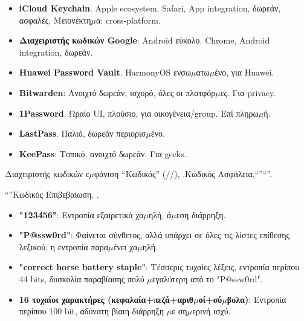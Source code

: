 

\begin{itemize}
  \item \textbf{iCloud Keychain}. Apple ecosystem. Safari, App integration, δωρεάν, ασφαλές. Μειονέκτη$\mu$α: cross-platform.
  \item \textbf{Διαχειριστής κωδικών Google}: Android εύκολο. Chrome, Android integration, δωρεάν.
  \item \textbf{Huawei Password Vault}. HarmonyOS ενσω$\mu$ατω$\mu$ένο, για Huawei.
\end{itemize}


\begin{itemize}
  \item \textbf{Bitwarden}: Ανοιχτό δωρεάν, ισχυρό, όλες οι πλατφόρ$\mu$ες. Για privacy.
  \item \textbf{1Password}. Ωραίο UI, πλούσιο, για οικογένεια/group. Επί πληρω$\mu$ή.
  \item \textbf{LastPass}. Παλιό, δωρεάν περιορισ$\mu$ένο.
  \item \textbf{KeePass}: Τοπικό, ανοιχτό δωρεάν. Για geeks.
\end{itemize}


Διαχειριστής κωδικών ε$\mu$φάνιση “Κωδικός” (//), .Κωδικός Ασφάλεια,“”“”.


“”Κωδικός Επιβεβαίωση. .

\begin{itemize}
  \item \textbf{"123456"}: Εντροπία εξαιρετικά χα$\mu$ηλή, ά$\mu$εση διάρρηξη.
  \item \textbf{"P@ssw0rd"}: Φαίνεται σύνθετος, αλλά υπάρχει σε όλες τις λίστες επίθεσης λεξικού, η εντροπία παρα$\mu$ένει χα$\mu$ηλή.
  \item \textbf{"correct horse battery staple"}: Τέσσερις τυχαίες λέξεις, εντροπία περίπου 44 bits, δυσκολία παραβίασης πολύ $\mu$εγαλύτερη από το "P@ssw0rd".
  \item \textbf{16 τυχαίοι χαρακτήρες (κεφαλαία+πεζά+αριθ$\mu$οί+σύ$\mu$βολα)}: Εντροπία περίπου 100 bit, αδύνατη βίαιη διάρρηξη $\mu$ε ση$\mu$ερινή ισχύ.
\end{itemize}

